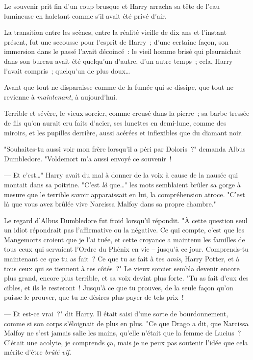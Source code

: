 \later

Le souvenir prit fin d'un coup brusque et Harry arracha sa tête de l'eau lumineuse en haletant comme s'il avait été privé d'air.

La transition entre les scènes, entre la réalité vieille de dix ans et l'instant présent, fut une secousse pour l'esprit de Harry~; d'une certaine façon, son immersion dans le passé l'avait décoincé~: le vieil homme brisé qui pleurnichait dans son bureau avait été quelqu'un d'autre, d'un autre temps~; cela, Harry l'avait compris~; quelqu'un de plus doux…

Avant que tout ne disparaisse comme de la fumée qui se dissipe, que tout ne revienne à \emph{maintenant}, à aujourd'hui.

Terrible et sévère, le vieux sorcier, comme creusé dans la pierre~; sa barbe tressée de fils qu'on aurait cru faits d'acier, ses lunettes en demi-lune, comme des miroirs, et les pupilles derrière, aussi acérées et inflexibles que du diamant noir.

"Souhaites-tu aussi voir mon frère lorsqu'il a péri par Doloris~?" demanda Albus Dumbledore. "Voldemort m'a aussi envoyé ce souvenir~!

--- Et c'est…" Harry avait du mal à donner de la voix à cause de la nausée qui montait dans sa poitrine. "C'est \emph{là} que…" les mots semblaient brûler sa gorge à mesure que le terrible savoir apparaissait en lui, la compréhension atroce. "C'est là que vous avez brûlée vive Narcissa Malfoy dans sa propre chambre."

Le regard d'Albus Dumbledore fut froid lorsqu'il répondit. "À cette question seul un idiot répondrait pas l'affirmative ou la négative. Ce qui compte, c'est que les Mangemorts croient que je l'ai tuée, et cette croyance a maintenu les familles de tous ceux qui servaient l'Ordre du Phénix en vie -- jusqu'à ce jour. Comprends-tu maintenant ce que tu as fait~? Ce que tu as fait à tes \emph{amis}, Harry Potter, et à tous ceux qui se tiennent à tes côtés~?" Le vieux sorcier sembla devenir encore plus grand, encore plus terrible, et sa voix devint plus forte. "Tu as fait d'eux des cibles, et ils le resteront~! Jusqu'à ce que tu prouves, de la seule façon qu'on puisse le prouver, que tu ne désires plus payer de tels prix~!

--- Et est-ce vrai~?" dit Harry. Il était saisi d'une sorte de bourdonnement, comme si son corps s'éloignait de plus en plus. "Ce que Drago a dit, que Narcissa Malfoy ne s'est jamais salie les mains, qu'elle n'était que la femme de Lucius~? C'était une acolyte, je comprends ça, mais je ne peux pas soutenir l'idée que cela mérite d'être \emph{brûlé vif}.

